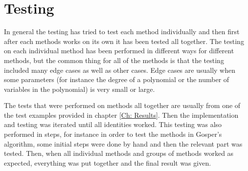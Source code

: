 \section{Testing}
In general the testing has tried to test each method individually and then first after each methods works on its own it has been tested all together. The testing on each individual method has been performed in different ways for different methods, but the common thing for all of the methods is that the testing included many edge cases as well as other cases. Edge cases are usually when some parameters (for instance the degree of a polynomial or the number of variables in the polynomial) is very small or large.

The tests that were performed on methods all together are usually from one of the test examples provided in chapter \ref{Ch: Results}. Then the implementation and testing was iterated until all identities worked. This testing was also performed in steps, for instance in order to test the methods in Gosper's algorithm, some initial steps were done by hand and then the relevant part was tested. Then, when all individual methods and groups of methods worked as expected, everything was put together and the final result was given.
